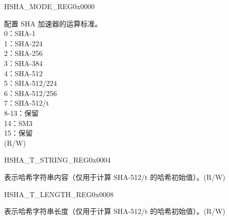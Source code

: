 \begin{register}{H}{SHA\_MODE\_REG}{0x0000}\label{regdesc:SHAMODEREG}
%
%
\regnewline%
\begin{regdesc}\begin{reglist}
\label{fielddesc:SHAMODE}\item [SHA\_MODE] 配置 SHA 加速器的运算标准。\\
0：SHA-1\\
1：SHA-224\\
2：SHA-256\\
3：SHA-384\\
4：SHA-512\\
5：SHA-512/224\\
6：SHA-512/256\\
7：SHA-512/t\\
8-13：保留\\
14：SM3\\
15：保留\\
(R/W)
\end{reglist}\end{regdesc}
\end{register}


\begin{register}{H}{SHA\_T\_STRING\_REG}{0x0004}\label{regdesc:SHATSTRINGREG}
%
\regnewline%
\begin{regdesc}\begin{reglist}
\label{fielddesc:SHATSTRING}\item [SHA\_T\_STRING] 表示哈希字符串内容（仅用于计算 SHA-512/t 的哈希初始值）。(R/W)
\end{reglist}\end{regdesc}
\end{register}


\begin{register}{H}{SHA\_T\_LENGTH\_REG}{0x0008}\label{regdesc:SHATLENGTHREG}
%
%
\regnewline%
\begin{regdesc}\begin{reglist}
\label{fielddesc:SHATLENGTH}\item [SHA\_T\_LENGTH] 表示哈希字符串长度（仅用于计算 SHA-512/t 的哈希初始值）。(R/W)
\end{reglist}\end{regdesc}
\end{register}

